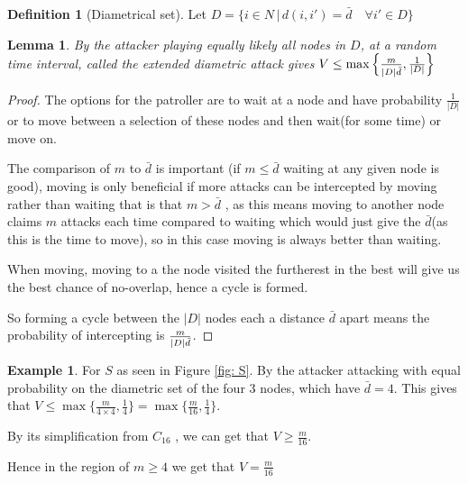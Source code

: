 \documentclass[a4paper,10pt]{article}
\newtheorem{lemma}[theorem]{Lemma}
\theoremstyle{definition}
\newtheorem{definition}[theorem]{Definition}
\theoremstyle{definition}
\newtheorem{example}[theorem]{Example}
\theoremstyle{remark}
\theoremstyle{definition}
\begin{document}
\begin{definition}[Diametrical set]
Let $D=\{ i \in N \, | \, d(i,i')=\bar{d} \quad \forall i' \in D \}$
\end{definition}

\begin{lemma}
By the attacker playing equally likely all nodes in $D$, at a random time interval, called the extended diametric attack gives $V \leq \max\left\{\frac{m}{\raisebox{-0.5ex}{$\scriptstyle |D| \bar{d}$}} , \frac{1}{|D|} \right\}$
\end{lemma}

\begin{proof}
The options for the patroller are to wait at a node and have probability $\frac{1}{|D|}$ or to move between a selection of these nodes and then wait(for some time) or move on. 

The comparison of $m$ to $\bar{d}$ is important (if $m \leq \bar{d}$ waiting at any given node is good), moving is only beneficial if more attacks can be intercepted by moving rather than waiting that is that $m > \bar{d}$ , as this means moving to another node claims $m$ attacks each time compared to waiting which would just give the $\bar{d}$(as this is the time to move), so in this case moving is always better than waiting.

When moving, moving to a the node visited the furtherest in the best will give us the best chance of no-overlap, hence a cycle is formed.

So forming a cycle between the $|D|$ nodes each a distance $\bar{d}$ apart means the probability of intercepting is $\frac{m}{\raisebox{-0.3ex}{$\scriptstyle |D| \bar{d}$}}$.

\end{proof}

\begin{example}
For $S$ as seen in Figure \ref{fig: S}. By the attacker attacking with equal probability on the diametric set of the four 3 nodes, which have $\bar{d}=4$. This gives that $V \leq \max \{ \frac{m}{4 \times 4} , \frac{1}{4} \}= \max \{ \frac{m}{16} , \frac{1}{4}  \}$.

By its simplification from $C_{16}$ , we can get that $V \geq \frac{m}{16}$.

Hence in the region of $m \geq 4$ we get that $V=\frac{m}{16}$
\end{example}
\end{document}
